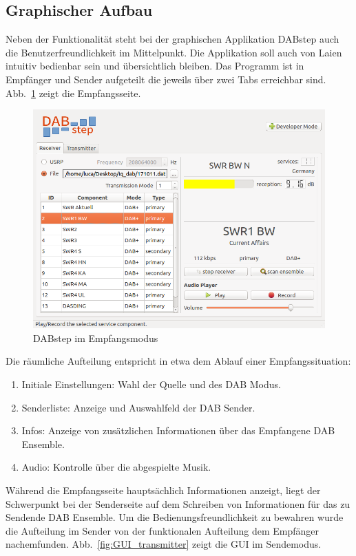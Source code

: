 \subsection{Graphischer Aufbau}
Neben der Funktionalität steht bei der graphischen Applikation DABstep auch die Benutzerfreundlichkeit im Mittelpunkt. Die Applikation soll auch von Laien intuitiv bedienbar sein und übersichtlich bleiben. Das Programm ist in Empfänger und Sender aufgeteilt die jeweils über zwei Tabs erreichbar sind. Abb.~\ref{fig:GUI_receiver} zeigt die Empfangsseite.
\begin{figure}[h]
\centering
  \includegraphics[width=\textwidth]{figures/GUI_receiver.png}
	\caption{DABstep im Empfangsmodus}
	\label{fig:GUI_receiver}
\end{figure}
Die räumliche Aufteilung entspricht in etwa dem Ablauf einer Empfangssituation:
\begin{enumerate}
\item Initiale Einstellungen: Wahl der Quelle und des DAB Modus.
\item Senderliste: Anzeige und Auswahlfeld der DAB Sender.
\item Infos: Anzeige von zusätzlichen Informationen über das Empfangene DAB Ensemble.
\item Audio: Kontrolle über die abgespielte Musik.
\end{enumerate}
Während die Empfangsseite hauptsächlich Informationen anzeigt, liegt der Schwerpunkt bei der Senderseite auf dem Schreiben von Informationen für das zu Sendende DAB Ensemble. Um die Bedienungsfreundlichkeit zu bewahren wurde die Aufteilung im Sender von der funktionalen Aufteilung dem Empfänger nachemfunden. Abb.~\ref{fig:GUI_transmitter} zeigt die GUI im Sendemodus.

